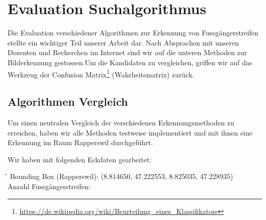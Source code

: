 \section{Evaluation Suchalgorithmus}
Die Evaluation verschiedener Algorithmen zur Erkennung von Fussgängerstreifen stellte ein wichtiger Teil unserer Arbeit dar. Nach Absprachen mit unseren Dozenten und Recherchen im Internet sind wir auf die unteren Methoden zur Bilderkennung gestossen.Um die Kandidaten zu vergleichen, griffen wir auf das Werkzeug der Confusion Matrix\footnote{\url{https://de.wikipedia.org/wiki/Beurteilung_eines_Klassifikators}} (Wahrheitsmatrix) zurück.

\subsection{Algorithmen Vergleich}
Um einen neutralen Vergleich der verschiedenen Erkennungsmethoden zu erreichen, haben wir alle Methoden testweise implementiert und mit ihnen eine Erkennung im Raum Rapperswil durchgeführt.

Wir haben mit folgenden Eckdaten gearbeitet:
\begin{tabbing}[H]
    \hspace*{5cm}\=\hspace*{6cm}\= \kill
    Bounding Box (Rapperswil): \> (8.814650, 47.222553, 8.825035, 47.228935) \\
    Anzahl Fussgängerstreifen:  \\
\end{tabbing}


